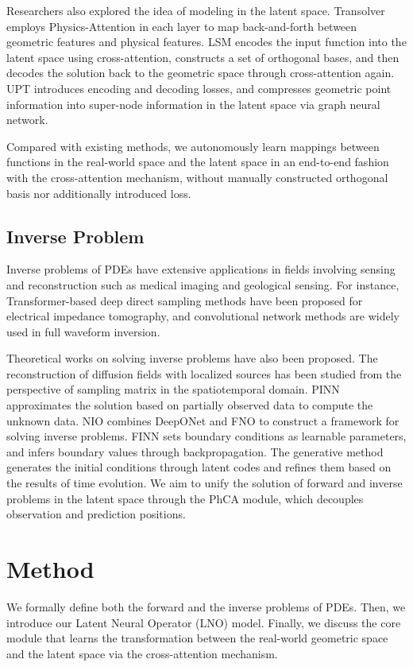 \documentclass{article}
\begin{document}
Researchers also explored the idea of modeling in the latent space. Transolver\cite{Transolver} employs Physics-Attention in each layer to map back-and-forth between geometric features and physical features. LSM\cite{LSM} encodes the input function into the latent space using cross-attention, constructs a set of orthogonal bases, and then decodes the solution back to the geometric space through cross-attention again. UPT\cite{UPT} introduces encoding and decoding losses, and compresses geometric point information into super-node information in the latent space via graph neural network\cite{GNN}.

Compared with existing methods, we autonomously learn mappings between functions in the real-world space and the latent space in an end-to-end fashion with the cross-attention mechanism, without manually constructed orthogonal basis nor additionally introduced loss.

\subsection{Inverse Problem}
Inverse problems of PDEs have extensive applications in fields involving sensing and reconstruction such as medical imaging and geological sensing. For instance, Transformer-based deep direct sampling methods\cite{TransformerBoundaryInverseProblem} have been proposed for electrical impedance tomography, and convolutional network methods\cite{ConvolutionalAutoEncoder,GPRInvNet,VelocityGAN} are widely used in full waveform inversion. 

Theoretical works on solving inverse problems have also been proposed. The reconstruction of diffusion fields with localized sources has been studied\cite{LuSampling} from the perspective of sampling matrix in the spatiotemporal domain. PINN\cite{PINN_Inverse1,PINN_Inverse2,PINN_Inverse3} approximates the solution based on partially observed data to compute the unknown data. NIO\cite{NIO} combines DeepONet\cite{DeepONet} and FNO\cite{FNO} to construct a framework for solving inverse problems. FINN\cite{FINN,FINN_BC} sets boundary conditions as learnable parameters, and infers boundary values through backpropagation. The generative method\cite{LSI} generates the initial conditions through latent codes and refines them based on the results of time evolution. We aim to unify the solution of forward and inverse problems in the latent space through the PhCA module, which decouples observation and prediction positions. 

\section{Method}
We formally define both the forward and the inverse problems of PDEs. Then, we introduce our Latent Neural Operator (LNO) model. Finally, we discuss the core module that learns the transformation between the real-world geometric space and the latent space via the cross-attention mechanism.
\end{document}
